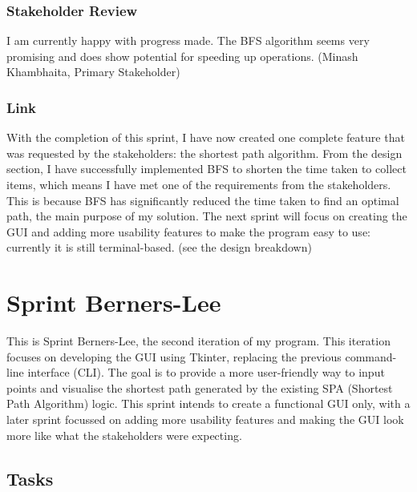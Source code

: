\subsubsection{Stakeholder Review}

I am currently happy with progress made. The BFS algorithm seems very promising and does show potential for speeding up operations. (Minash Khambhaita, Primary Stakeholder)

\subsubsection{Link}

With the completion of this sprint, I have now created one complete feature that was requested by the stakeholders: the shortest path algorithm. From the design section, I have successfully implemented BFS to shorten the time taken to collect items, which means I have met one of the requirements from the stakeholders. This is because BFS has significantly reduced the time taken to find an optimal path, the main purpose of my solution. \newline The next sprint will focus on creating the GUI and adding more usability features to make the program easy to use: currently it is still terminal-based. (see the design breakdown)


\clearpage


\section{Sprint Berners-Lee}

This is Sprint Berners-Lee, the second iteration of my program. This iteration focuses on developing the GUI using Tkinter, replacing the previous command-line interface (CLI). The goal is to provide a more user-friendly way to input points and visualise the shortest path generated by the existing SPA (Shortest Path Algorithm) logic. This sprint intends to create a functional GUI only, with a later sprint focussed on adding more usability features and making the GUI look more like what the stakeholders were expecting.

\subsection{Tasks}

